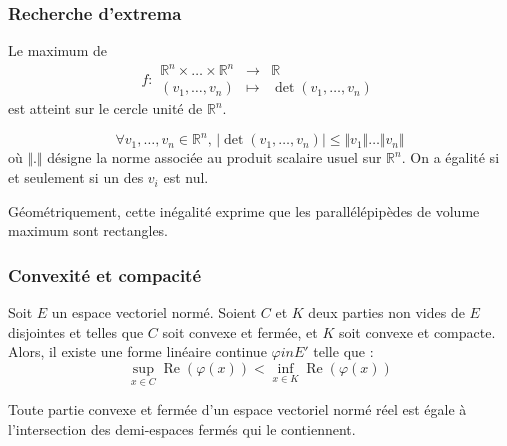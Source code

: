   \subsubsection{Recherche d'extrema}


  \begin{proposition}
    Le maximum de
    \[
    f :
    \begin{array}{ccc}
      \mathbb{R}^n \times \dots \times \mathbb{R}^n &\rightarrow& \mathbb{R} \\
      (v_1, \dots, v_n) &\mapsto& \det(v_1, \dots, v_n)
    \end{array}
    \]
    est atteint sur le cercle unité de $\mathbb{R}^n$.
  \end{proposition}

  \begin{corollary}
    \[ \forall v_1, \dots, v_n \in \mathbb{R}^n, \, \vert \det(v_1, \dots, v_n) \vert \leq \Vert v_1 \Vert \dots \Vert v_n \Vert \]
    où $\Vert . \Vert$ désigne la norme associée au produit scalaire usuel sur $\mathbb{R}^n$. On a égalité si et seulement si un des $v_i$ est nul.
  \end{corollary}

  \begin{remark}
    Géométriquement, cette inégalité exprime que les parallélépipèdes de volume maximum sont rectangles.
  \end{remark}

  \subsubsection{Convexité et compacité}


  \begin{theorem}
    Soit $E$ un espace vectoriel normé. Soient $C$ et $K$ deux parties non vides de $E$ disjointes et telles que $C$ soit convexe et fermée, et $K$ soit convexe et compacte.
    Alors, il existe une forme linéaire continue $\varphi in E'$ telle que :
    \[ \sup_{x \in C} \operatorname{Re}(\varphi(x)) < \inf_{x \in K} \operatorname{Re}(\varphi(x)) \]
  \end{theorem}

  \begin{corollary}
    Toute partie convexe et fermée d'un espace vectoriel normé réel est égale à
    l'intersection des demi-espaces fermés qui le contiennent.
  \end{corollary}


